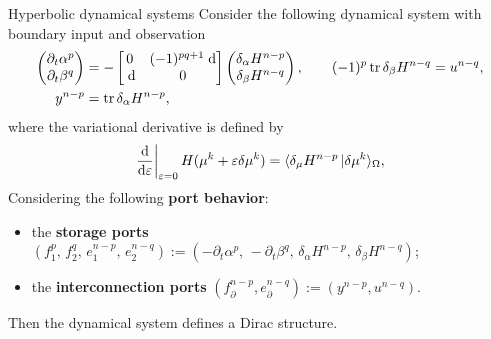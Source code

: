 \documentclass[aspectratio=169]{beamer}
\DeclareMathOperator{\tr}{tr}
\newcommand{\dualpr}[3][]{\ensuremath{\langle #2 \, \vert #3 \rangle_{#1}}}
\begin{document}
\begin{frame}{Hyperbolic dynamical systems}
	Consider the following dynamical system with boundary input and observation
	\begin{equation*}
	\begin{aligned}
		\begin{pmatrix}
			\partial_t \alpha^p \\
			\partial_t \beta^q\\
		\end{pmatrix} &= 
		-\begin{bmatrix}
			0 & (-1)^{pq+1}\d \\
			\d & 0 \\
		\end{bmatrix}
		\begin{pmatrix}
			\delta_{\alpha} H^{n-p}\\
			\delta_{\beta} H^{n-q}\\
		\end{pmatrix}, \qquad (-1)^p\tr \delta_{\beta} H^{n-q} = u^{n-q}, \\
		y^{n-p} &= \tr \delta_{\alpha} H^{n-p}, 
	\end{aligned}	
	\end{equation*}
where the variational derivative is defined by
\begin{equation*}
	\begin{aligned}
		\left.\diff{}{\varepsilon}\right|_{\varepsilon = 0} H({\mu}^k + \varepsilon \delta {\mu}^k) = \dualpr[\Omega]{\delta_{\mu} H^{n-p}}{\delta {\mu}^k},
	\end{aligned}
\end{equation*}
Considering the following \textbf{port behavior}:
\begin{itemize}
	\item
	the \textbf{storage ports} $({f}_1^p,\, f_2^q,\, e_1^{n-p}, \, e_2^{n-q}) := (-\partial_t \alpha^p,\,  -\partial_t \beta^q, \,  \delta_{\alpha} H^{n-p}, \,  \delta_{\beta} H^{n-q})$;
	\item
	the \textbf{interconnection ports} $({f}_{\partial}^{n-p}, {e}_{\partial}^{n-q}) := ({y}^{n-p}, {u}^{n-q} )$.
\end{itemize}
Then the dynamical system defines a Dirac structure.

\end{frame}
\end{document}
